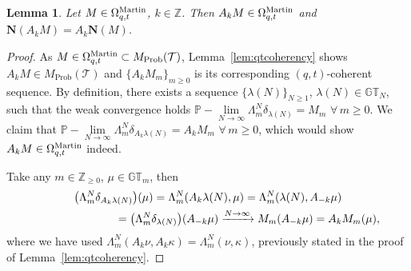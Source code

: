 \documentclass[pdftex]{sigma}
\numberwithin{equation}{section}
\newtheorem{lem}[thm]{Lemma}
\newcommand{\Z}{\mathbb{Z}}
\newcommand{\GT}{\mathbb{GT}}
\newcommand{\Tau}{\mathcal{T}}
\newcommand{\Mart}{\Omega_{q, t}^{\rm Martin}}
\newcommand{\NN}{\mathbf{N}}
\begin{document}
\begin{lem}\label{lem:commutingops}
Let $M\in\Mart$, $k\in\Z$. Then $A_k M \in\Mart$ and $\NN(A_k M) = A_k \NN(M)$.
\end{lem}
\begin{proof}
As $M\in\Mart\subset M_{\textrm{Prob}}(\Tau)$, Lemma~\ref{lem:qtcoherency} shows $A_k M\in M_{\textrm{Prob}}(\Tau)$ and $\{A_kM_m\}_{m \geq 0}$ is its corresponding $(q, t)$-coherent sequence. By def\/inition, there exists a sequence $\{\lambda(N)\}_{N \geq 1}$, $\lambda(N)\in\GT_N$, such that the weak convergence holds $\mathbb{P}-\lim\limits_{N\rightarrow\infty}{\Lambda^N_m\delta_{\lambda(N)}} = M_m$ $\forall\, m \geq 0$. We claim that $\mathbb{P}-\lim\limits_{N\rightarrow\infty}{\Lambda^N_m\delta_{A_k\lambda(N)}} = A_kM_m$ $\forall\, m \geq 0$, which would show $A_k M\in\Mart$ indeed.

Take any $m\in\Z_{\geq 0}$, $\mu\in\GT_m$, then
\begin{gather*}
\big(\Lambda^N_m\delta_{A_k\lambda(N)}\big)(\mu)
= \Lambda^N_m ( A_k\lambda(N), \mu )
= \Lambda^N_m ( \lambda(N), A_{-k}\mu )\\
\hphantom{\big(\Lambda^N_m\delta_{A_k\lambda(N)}\big)(\mu)}{}
= \big( \Lambda^N_m\delta_{\lambda(N)} \big) (A_{-k}\mu)
\xrightarrow{N\rightarrow\infty} M_m(A_{-k}\mu) = A_k M_m (\mu),
\end{gather*}
where we have used $\Lambda^N_m(A_k\nu, A_k\kappa) = \Lambda^N_m(\nu, \kappa)$, previously stated in the proof of Lemma~\ref{lem:qtcoherency}.


\end{proof}
\end{document}
